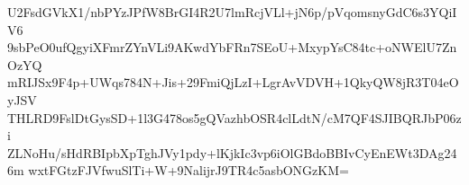 U2FsdGVkX1/nbPYzJPfW8BrGI4R2U7lmRcjVLl+jN6p/pVqomsnyGdC6s3YQiIV6
9sbPeO0ufQgyiXFmrZYnVLi9AKwdYbFRn7SEoU+MxypYsC84tc+oNWElU7ZnOzYQ
mRIJSx9F4p+UWqs784N+Jis+29FmiQjLzI+LgrAvVDVH+1QkyQW8jR3T04eOyJSV
THLRD9FslDtGysSD+1l3G478os5gQVazhbOSR4clLdtN/cM7QF4SJIBQRJbP06zi
ZLNoHu/sHdRBIpbXpTghJVy1pdy+lKjkIc3vp6iOlGBdoBBIvCyEnEWt3DAg246m
wxtFGtzFJVfwuSlTi+W+9NalijrJ9TR4c5asbONGzKM=
